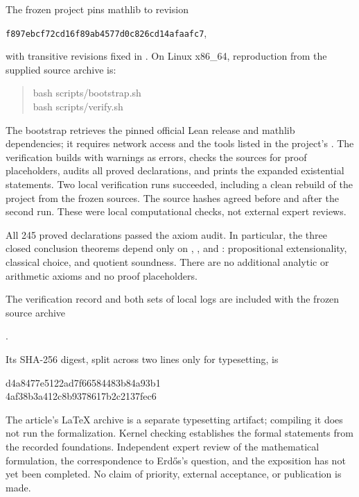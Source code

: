 \documentclass[11pt,reqno]{amsart}
\theoremstyle{definition}
\theoremstyle{remark}
\numberwithin{equation}{section}
\begin{document}
The frozen project pins mathlib to revision
\begin{center}\small
\texttt{f897ebcf72cd16f89ab4577d0c826cd14afaafc7},
\end{center}
with transitive revisions fixed in . On Linux
x86\_64, reproduction from the supplied source archive is:
\begin{quote}\small\ttfamily
bash scripts/bootstrap.sh\\
bash scripts/verify.sh
\end{quote}
The bootstrap retrieves the pinned official Lean release and mathlib
dependencies; it requires network access and the tools listed in the
project's . The verification builds with warnings as
errors, checks the sources for proof placeholders, audits all proved
declarations, and prints the expanded existential statements.
Two local verification runs succeeded, including a clean rebuild of the
project from the frozen sources. The source hashes agreed before and
after the second run. These were local computational checks, not external
expert reviews.

All 245 proved declarations passed the axiom audit. In particular, the
three closed conclusion theorems depend only on
, , and :
propositional extensionality, classical choice, and quotient soundness.
There are no additional analytic or arithmetic axioms and no proof
placeholders.

\begin{samepage}
The verification record and both sets of local logs are
included with the frozen source archive
\begin{center}\small
{}.
\end{center}
Its SHA-256 digest, split across two lines only for typesetting, is
\begin{center}\small\ttfamily
 d4a8477e5122ad7f66584483b84a93b1\\
 4af38b3a412c8b9378617b2c2137fec6
\end{center}
\end{samepage}
The article's LaTeX archive is a separate typesetting artifact; compiling
it does not run the formalization. Kernel checking establishes the formal
statements from the recorded foundations. Independent expert review of
the mathematical formulation, the correspondence to Erd\H{o}s's question,
and the exposition has not yet been completed. No claim of priority,
external acceptance, or publication is made.
\end{document}
